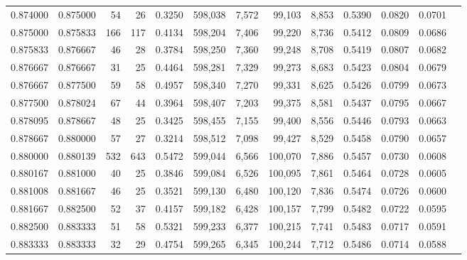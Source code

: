 \begin{tabular}{rrrrrrrrrrrrr}
0.874000 & 0.875000 &    54 &  26 &                                     0.3250 & 598,038 &   7,572 &  99,103 &   8,853 & 0.5390 & 0.0820 & 0.0701 \\
0.875000 & 0.875833 &   166 & 117 &                                     0.4134 & 598,204 &   7,406 &  99,220 &   8,736 & 0.5412 & 0.0809 & 0.0686 \\
0.875833 & 0.876667 &    46 &  28 &                                     0.3784 & 598,250 &   7,360 &  99,248 &   8,708 & 0.5419 & 0.0807 & 0.0682 \\
0.876667 & 0.876667 &    31 &  25 &                                     0.4464 & 598,281 &   7,329 &  99,273 &   8,683 & 0.5423 & 0.0804 & 0.0679 \\
0.876667 & 0.877500 &    59 &  58 &                                     0.4957 & 598,340 &   7,270 &  99,331 &   8,625 & 0.5426 & 0.0799 & 0.0673 \\
0.877500 & 0.878024 &    67 &  44 &                                     0.3964 & 598,407 &   7,203 &  99,375 &   8,581 & 0.5437 & 0.0795 & 0.0667 \\
0.878095 & 0.878667 &    48 &  25 &                                     0.3425 & 598,455 &   7,155 &  99,400 &   8,556 & 0.5446 & 0.0793 & 0.0663 \\
0.878667 & 0.880000 &    57 &  27 &                                     0.3214 & 598,512 &   7,098 &  99,427 &   8,529 & 0.5458 & 0.0790 & 0.0657 \\
0.880000 & 0.880139 &   532 & 643 &                                     0.5472 & 599,044 &   6,566 & 100,070 &   7,886 & 0.5457 & 0.0730 & 0.0608 \\
0.880167 & 0.881000 &    40 &  25 &                                     0.3846 & 599,084 &   6,526 & 100,095 &   7,861 & 0.5464 & 0.0728 & 0.0605 \\
0.881008 & 0.881667 &    46 &  25 &                                     0.3521 & 599,130 &   6,480 & 100,120 &   7,836 & 0.5474 & 0.0726 & 0.0600 \\
0.881667 & 0.882500 &    52 &  37 &                                     0.4157 & 599,182 &   6,428 & 100,157 &   7,799 & 0.5482 & 0.0722 & 0.0595 \\
0.882500 & 0.883333 &    51 &  58 &                                     0.5321 & 599,233 &   6,377 & 100,215 &   7,741 & 0.5483 & 0.0717 & 0.0591 \\
0.883333 & 0.883333 &    32 &  29 &                                     0.4754 & 599,265 &   6,345 & 100,244 &   7,712 & 0.5486 & 0.0714 & 0.0588 \\

\end{tabular}
